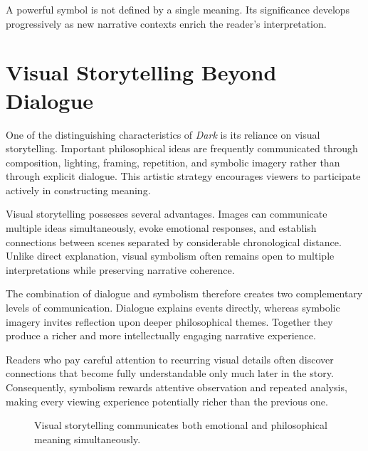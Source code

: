 \documentclass[12pt,oneside,openany]{book}
\begin{document}
\begin{tcolorbox}[colback=green!6,colframe=green!50!black,title=Key Concept]
A powerful symbol is not defined by a single meaning. Its significance develops
progressively as new narrative contexts enrich the reader's interpretation.
\end{tcolorbox}

\section{Visual Storytelling Beyond Dialogue}

One of the distinguishing characteristics of \textit{Dark} is its reliance on
visual storytelling. Important philosophical ideas are frequently communicated
through composition, lighting, framing, repetition, and symbolic imagery rather
than through explicit dialogue. This artistic strategy encourages viewers to
participate actively in constructing meaning.

Visual storytelling possesses several advantages. Images can communicate
multiple ideas simultaneously, evoke emotional responses, and establish
connections between scenes separated by considerable chronological distance.
Unlike direct explanation, visual symbolism often remains open to multiple
interpretations while preserving narrative coherence.

The combination of dialogue and symbolism therefore creates two complementary
levels of communication. Dialogue explains events directly, whereas symbolic
imagery invites reflection upon deeper philosophical themes. Together they
produce a richer and more intellectually engaging narrative experience.

Readers who pay careful attention to recurring visual details often discover
connections that become fully understandable only much later in the story.
Consequently, symbolism rewards attentive observation and repeated analysis,
making every viewing experience potentially richer than the previous one.
\begin{figure}[H]
\centering
{}

\caption{Visual storytelling communicates both emotional and philosophical meaning simultaneously.}
\end{figure}
\end{document}
